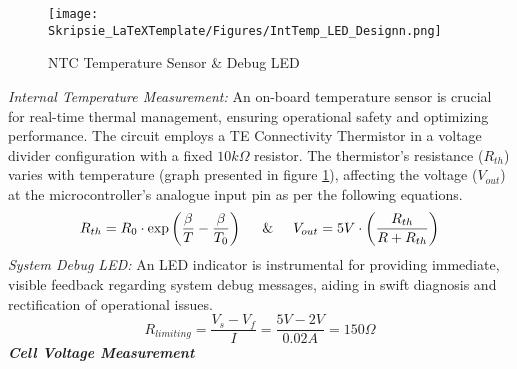 \begin{figure}[h!]
\centering
\texttt{[image: Skripsie\_LaTeXTemplate/Figures/IntTemp\_LED\_Designn.png]}
\caption{NTC Temperature Sensor \cite{IntTemp} \& Debug LED \cite{LED}}
\label{fig:MM_D5}
\end{figure}
\noindent
\emph{Internal Temperature Measurement:}\newline
\noindent
An on-board temperature sensor is crucial for real-time thermal management, ensuring operational safety and optimizing performance. The circuit employs a TE Connectivity Thermistor in a voltage divider configuration with a fixed \(10k\Omega\) resistor. The thermistor's resistance (\( R_{th} \)) varies with temperature (graph presented in figure \ref{fig:MM_D5}), affecting the voltage (\( V_{out} \)) at the microcontroller's analogue input pin as per the following equations.
\[ R_{th} = R_0 \cdot \exp \left( \frac{\beta}{T} - \frac{\beta}{T_0} \right) \hspace{0.5cm} \& \hspace{0.5cm} V_{out} = 5V \cdot \left( \frac{R_{th}}{R + R_{th}} \right) \]
\noindent
\emph{System Debug LED:}\newline
\noindent
An LED indicator is instrumental for providing immediate, visible feedback regarding system debug messages, aiding in swift diagnosis and rectification of operational issues.
\[ R_{limiting} = \frac{V_s - V_f}{I} = \frac{5V - 2V}{0.02A} = 150 \Omega \]
\noindent
\textbf{\emph{Cell Voltage Measurement}}\label{subsubsec:adc_design}


